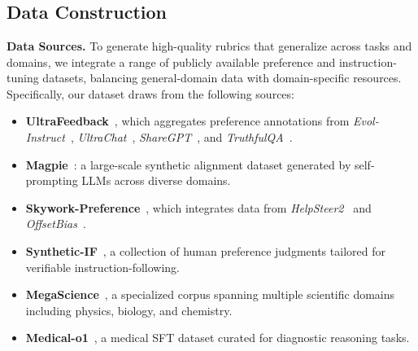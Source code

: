 \section{\dataset{}}
\label{sec:dataset}
\subsection{Data Construction}
\label{sec:data_construct}
\textbf{Data Sources.} To generate high-quality rubrics that generalize across tasks and domains, we integrate a range of publicly available preference and instruction-tuning datasets, 
balancing general-domain data with domain-specific resources.  
Specifically, our dataset draws from the following sources:
\begin{itemize}[leftmargin=0.4cm,itemsep=0.1pt]
    \item \textbf{UltraFeedback}~\citep{cui2024ultrafeedback}, which aggregates preference annotations from 
    \emph{Evol-Instruct}~\citep{xu2024wizardlm}, \emph{UltraChat}~\citep{ultrachat}, \emph{ShareGPT}~\citep{sharegpt}, and \emph{TruthfulQA}~\citep{lin-etal-2022-truthfulqa}.
    \item \textbf{Magpie}~\citep{xu2025magpie}: a large-scale synthetic alignment dataset generated by self-prompting LLMs across diverse domains.
    \item \textbf{Skywork-Preference}~\citep{liu2024skywork}, which integrates data from \emph{HelpSteer2}~\citep{wang2024helpsteer} and \emph{OffsetBias}~\citep{offsetbias}.
    \item \textbf{Synthetic-IF}~\citep{lambert2025tulu}, a collection of human preference judgments tailored for verifiable instruction-following.
    \item \textbf{MegaScience}~\citep{fan2025megascience}, a specialized corpus spanning multiple scientific domains including physics, biology, and chemistry.
    \item \textbf{Medical-o1}~\citep{chen2024huatuogpt}, a medical SFT dataset curated for diagnostic reasoning tasks.
\end{itemize}


